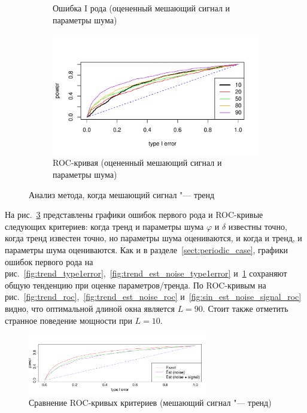 \documentclass[specialist,
substylefile = spbu_report.rtx,
subf,href,colorlinks=true, 12pt]{disser}
\theoremstyle{definition}
\begin{document}
\begin{figure}[h!]
\begin{subfigure}[t]{0.5\textwidth}
		\caption{Ошибка I рода (оцененный мешающий сигнал и параметры шума)}
		\label{fig:trend_est_noise_signal_type1error}
	\end{subfigure}\hspace{\fill}
	\begin{subfigure}[t]{0.5\textwidth}
		\centering
		\includegraphics[width=\textwidth]{img/roc_sin_est_noise_signal.pdf}
		\caption{ROC-кривая (оцененный мешающий сигнал и параметры шума)}
		\label{fig:trend_est_noise_signal_roc}
	\end{subfigure}
	\caption{Анализ метода, когда мешающий сигнал "--- тренд}
\label{fig:trend}
\end{figure}

На рис.~\ref{fig:trend} представлены графики ошибок первого рода и ROC-кривые следующих критериев: когда тренд и параметры шума $\varphi$ и $\delta$ известны точно, когда тренд известен точно, но параметры шума оцениваются, и когда и тренд, и параметры шума оцениваются. Как и в разделе~\ref{sect:periodic_case}, графики ошибок первого рода на рис.~\ref{fig:trend_type1error},~\ref{fig:trend_est_noise_type1error} и~\ref{fig:trend_est_noise_signal_type1error} сохраняют общую тенденцию при оценке параметров/тренда. По ROC-кривым на рис.~\ref{fig:trend_roc},~\ref{fig:trend_est_noise_roc} и~\ref{fig:sin_est_noise_signal_roc} видно, что оптимальной длиной окна является $L=90$. Стоит также отметить странное поведение мощности при $L=10$.

\begin{figure}[h!]
	\centering
	\includegraphics[width=0.7\textwidth]{img/roc_trend_copm.pdf}
	\caption{Сравнение ROC-кривых критериев (мешающий сигнал "--- тренд)}
	\label{fig:power_comp_trend}
\end{figure}
\end{document}
